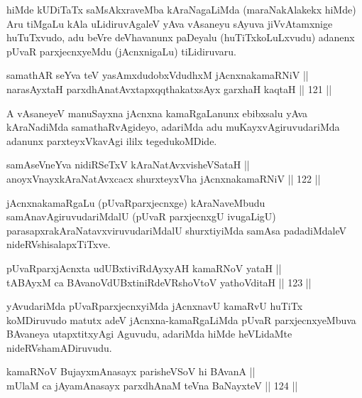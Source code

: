 \begin{artha}
hiMde kUDiTaTx saMsAkxraveMba kAraNagaLiMda (maraNakAlakekx hiMde) Aru
tiMgaLu kAla uLidiruvAgaleV yAva vAsaneyu sAyuva jiVvAtamxnige
huTuTxvudo, adu beVre deVhavanunx paDeyalu (huTiTxkoLuLxvudu) adanenx
pUvaR parxjecnxyeMdu (jAcnxnigaLu) tiLidiruvaru.
\end{artha}

\begin{shl}
samathAR seYva teV yasAmxdudobxVdudhxM jAcnxnakamaRNiV || \\
narasAyxtaH parxdhAnatAvxtapxqqthakatxsAyx garxhaH kaqtaH \hfill || 121 ||  
\end{shl}

\begin{artha}
A vAsaneyeV manuSayxna jAcnxna kamaRgaLanunx ebibxsalu yAva
kAraNadiMda samathaRvAgideyo, adariMda adu muKayxvAgiruvudariMda
adanunx parxteyxVkavAgi ililx tegedukoMDide.
\end{artha}


\begin{shl}
samAseVneYva nidiRSeTxV kAraNatAvxvisheVSataH || \\
anoyxVnayxkAraNatAvxcacx shurxteyxVha jAcnxnakamaRNiV \hfill || 122 ||  
\end{shl}

\begin{artha}
jAcnxnakamaRgaLu (pUvaRparxjecnxge) kAraNaveMbudu
samAnavAgiruvudariMdalU (pUvaR parxjecnxgU ivugaLigU)
parasapxrakAraNatavxviruvudariMdalU shurxtiyiMda samAsa padadiMdaleV
nideRVshisalapxTiTxve.
\end{artha}

\begin{shl}
pUvaRparxjAcnxta udUBxtiviRdAyxyAH kamaRNoV yataH || \\
tABAyxM ca BAvanoVdUBxtiniRdeVRshoV\s toV yathoVditaH \hfill || 123 ||  
\end{shl}

\begin{artha}
yAvudariMda pUvaRparxjecnxyiMda jAcnxnavU kamaRvU huTiTx koMDiruvudo
matutx adeV jAcnxna-kamaRgaLiMda pUvaR parxjecnxyeMbuva BAvaneya
utapxtitxyAgi Aguvudu, adariMda hiMde heVLidaMte nideRVshamADiruvudu.
\end{artha}


\begin{shl}
kamaRNoV BujayxmAnasayx parisheVSoV hi BAvanA || \\
mUlaM ca jAyamAnasayx parxdhAnaM teVna BaNayxteV \hfill || 124 ||  
\end{shl}

